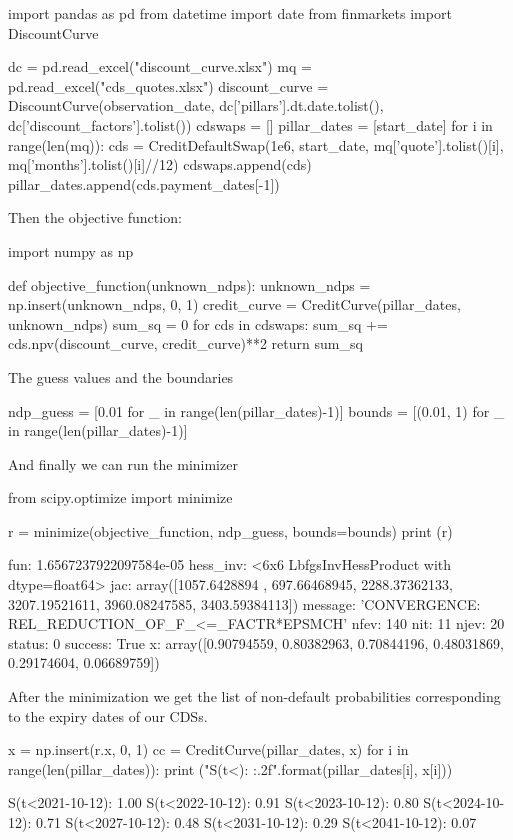 \begin{ipython}
import pandas as pd
from datetime import date
from finmarkets import DiscountCurve

dc = pd.read_excel("discount_curve.xlsx")
mq = pd.read_excel("cds_quotes.xlsx")
discount_curve = DiscountCurve(observation_date,
                               dc['pillars'].dt.date.tolist(),
                               dc['discount_factors'].tolist())
cdswaps = []
pillar_dates = [start_date]
for i in range(len(mq)):
    cds = CreditDefaultSwap(1e6, start_date,
                            mq['quote'].tolist()[i],
                            mq['months'].tolist()[i]//12)
    cdswaps.append(cds)
    pillar_dates.append(cds.payment_dates[-1])
\end{ipython}
\noindent
Then the objective function:
\begin{ipython}
import numpy as np

def objective_function(unknown_ndps):
    unknown_ndps = np.insert(unknown_ndps, 0, 1)
    credit_curve = CreditCurve(pillar_dates, unknown_ndps)
    sum_sq = 0
    for cds in cdswaps:
        sum_sq += cds.npv(discount_curve, credit_curve)**2
    return sum_sq
\end{ipython}
\noindent
The guess values and the boundaries
\begin{ipython}
ndp_guess = [0.01 for _ in range(len(pillar_dates)-1)]
bounds = [(0.01, 1) for _ in range(len(pillar_dates)-1)]
\end{ipython}
\noindent
And finally we can run the minimizer
\begin{ipython}
from scipy.optimize import minimize

r = minimize(objective_function, ndp_guess, bounds=bounds)
print (r)
\end{ipython}
\begin{ioutput}
      fun: 1.6567237922097584e-05
 hess_inv: <6x6 LbfgsInvHessProduct with dtype=float64>
      jac: array([1057.6428894 ,  697.66468945, 2288.37362133, 
                  3207.19521611, 3960.08247585, 3403.59384113])
  message: 'CONVERGENCE: REL_REDUCTION_OF_F_<=_FACTR*EPSMCH'
     nfev: 140
      nit: 11
     njev: 20
   status: 0
  success: True
        x: array([0.90794559, 0.80382963, 0.70844196, 0.48031869, 
                  0.29174604, 0.06689759])
\end{ioutput}

After the minimization we get the list of non-default probabilities corresponding to the expiry dates of our CDSs.

\begin{ipython}
x = np.insert(r.x, 0, 1)
cc = CreditCurve(pillar_dates, x)
for i in range(len(pillar_dates)):
    print ("S(t<{}): {:.2f}".format(pillar_dates[i], x[i]))
\end{ipython}
\begin{ioutput}
S(t<2021-10-12): 1.00
S(t<2022-10-12): 0.91
S(t<2023-10-12): 0.80
S(t<2024-10-12): 0.71
S(t<2027-10-12): 0.48
S(t<2031-10-12): 0.29
S(t<2041-10-12): 0.07
\end{ioutput}

